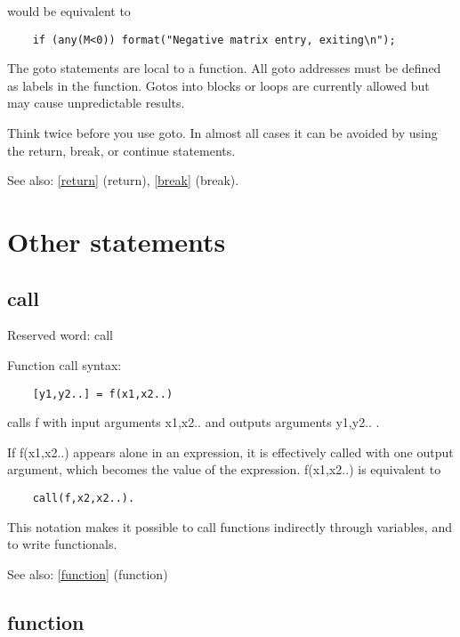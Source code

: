 \documentclass[a4paper]{article}
\begin{document}
would be equivalent to
\begin{tscreen}
\begin{verbatim}
    if (any(M<0)) format("Negative matrix entry, exiting\n");
\end{verbatim}
\end{tscreen}


The goto statements are local to a function. All goto addresses
must be defined as labels in the function. Gotos into blocks or
loops are currently allowed but may cause unpredictable results.

Think twice before you use goto. In almost all cases it can be
avoided by using the return, break, or continue statements.

See also: \ref{return} {(return)}, \ref{break} {(break)}.




\section{Other statements}


\subsection{call\label{call}}

Reserved word: call

Function call syntax:

\begin{tscreen}
\begin{verbatim}
    [y1,y2..] = f(x1,x2..)
\end{verbatim}
\end{tscreen}

calls f with input arguments x1,x2.. and outputs arguments y1,y2.. .

If f(x1,x2..) appears alone in an expression, it is effectively called
with one output argument, which becomes the value of the expression.
f(x1,x2..) is equivalent to
\begin{tscreen}
\begin{verbatim}
    call(f,x2,x2..).
\end{verbatim}
\end{tscreen}

This notation makes it possible to call functions indirectly through
variables, and to write functionals.

See also: \ref{function} {(function)}




\subsection{function\label{function}}
\end{document}
